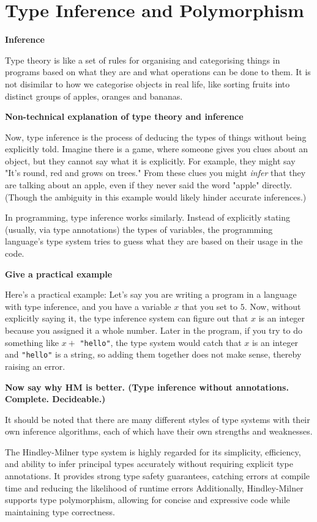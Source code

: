 \documentclass{l4proj}
\begin{document}
\section{Type Inference and Polymorphism}
\textbf{Inference}

Type theory is like a set of rules for organising and categorising things in programs based on what they are and what operations can be done to them.
It is not disimilar to how we categorise objects in real life, like sorting fruits into distinct groups of apples, oranges and bananas.

\textbf{Non-technical explanation of type theory and inference}

Now, type inference is the process of deducing the types of things without being explicitly told.
Imagine there is a game, where someone gives you clues about an object, but they cannot say what it is explicitly.
For example, they might say "It's round, red and grows on trees."
From these clues you might \emph{infer} that they are talking about an apple, even if they never said the word "apple" directly. 
(Though the ambiguity in this example would likely hinder accurate inferences.)

In programming, type inference works similarly.
Instead of explicitly stating (usually, via type annotations) the types of variables, the programming language's type system tries to guess what they are based on their usage in the code.

\textbf{Give a practical example}

Here's a practical example: Let's say you are writing a program in a language with type inference, and you have a variable $x$ that you set to $5$.
Now, without explicitly saying it, the type inference system can figure out that $x$ is an integer because you assigned it a whole number.
Later in the program, if you try to do something like $x +$ \texttt{"hello"}, the type system would catch that $x$ is an integer and \texttt{"hello"} is a string, so adding them together does not make sense, thereby raising an error.

\textbf{Now say why HM is better. (Type inference without annotations. Complete. Decideable.)}

It should be noted that there are many different styles of type systems with their own inference algorithms, each of which have their own strengths and weaknesses.

The Hindley-Milner type system is highly regarded for its simplicity, efficiency, and ability to infer principal types accurately without requiring explicit type annotations.
It provides strong type safety guarantees, catching errors at compile time and reducing the likelihood of runtime errors
Additionally, Hindley-Milner supports type polymorphism, allowing for concise and expressive code while maintaining type correctness. 
\end{document}
